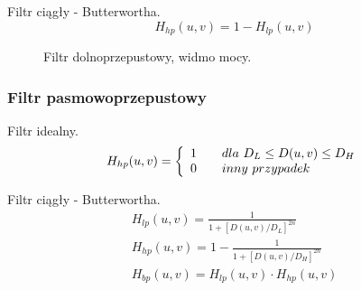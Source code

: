 \documentclass{classrep}
\begin{document}
Filtr ciągły - Butterwortha.
\begin{equation}
H_{hp}(u,v) = 1 - H_{lp}(u,v)
\end{equation}

 \begin{figure}[H]
  \centering
  \caption{Filtr dolnoprzepustowy, widmo mocy.}
  \label{fig_widmo_lena_hp}
\end{figure}

\subsubsection{Filtr pasmowoprzepustowy}

Filtr idealny.
\begin{equation}
  H_{hp}(u,v) = \left\{
  \begin{array}{l l}
    1 & \quad dla\ D_L \leq D(u,v) \leq D_H \\
    0 & \quad inny\ przypadek \\
  \end{array} \right.
\end{equation}

Filtr ciągły - Butterwortha.
\begin{eqnarray}
H_{lp}(u,v) = \frac{1}{1+ \left[ D(u,v) / D_L\right] ^{2n} }\\
H_{hp}(u,v) =1 - \frac{1}{1+ \left[ D(u,v) / D_H\right] ^{2n} }\\
H_{bp}(u,v) = H_{lp}(u,v) \cdot H_{hp}(u,v)
\end{eqnarray}
\end{document}
